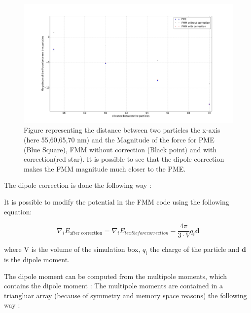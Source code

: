\documentclass[12pt,twoside,a4paper]{report}
\begin{document}
	
	\begin{figure}[H]
	   \includegraphics[scale=0.2]{dipoleCorrection}
    \centering 
    \caption{Figure representing the distance between two particles the x-axis (here 55,60,65,70 nm) and the  Magnitude of the force for PME (Blue Square), FMM without correction (Black point) and with correction(red star).
     It is possible to see that the dipole correction makes the FMM magnitude much closer to the PME.}    
   \end{figure}  	
	
The dipole correction is done the following way :

It is possible to modify the potential in the FMM code using the following equation:

\begin{equation}
\label{eq:dipoleCorrection}
\nabla_iE_{\text{after correction}} = \nabla_iE_{text{before correction}} - \frac{4\pi}{3 \cdot V} q_i \textbf{d}
\end{equation}	
	
	where V is the volume of the simulation box, $q_i$ the charge of the particle and $\textbf{d}$ is the dipole moment.

The dipole moment can be computed from the multipole moments, which contains the dipole moment : The multipole moments are contained in a triangluar array (because of symmetry and memory space reasons) the following way :
\end{document}
